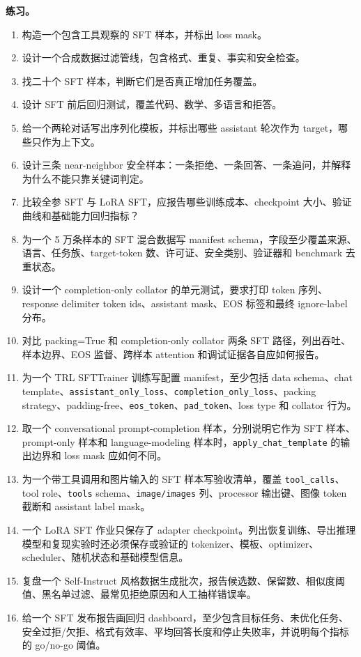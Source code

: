 \documentclass[UTF8,zihao=-4,openany]{ctexbook}
\begin{document}
\textbf{练习。}
\begin{enumerate}
\item 构造一个包含工具观察的 SFT 样本，并标出 loss mask。
\item 设计一个合成数据过滤管线，包含格式、重复、事实和安全检查。
\item 找二十个 SFT 样本，判断它们是否真正增加任务覆盖。
\item 设计 SFT 前后回归测试，覆盖代码、数学、多语言和拒答。
\item 给一个两轮对话写出序列化模板，并标出哪些 assistant 轮次作为 target，哪些只作为上下文。
\item 设计三条 near-neighbor 安全样本：一条拒绝、一条回答、一条追问，并解释为什么不能只靠关键词判定。
\item 比较全参 SFT 与 LoRA SFT，应报告哪些训练成本、checkpoint 大小、验证曲线和基础能力回归指标？
\item 为一个 5 万条样本的 SFT 混合数据写 manifest schema，字段至少覆盖来源、语言、任务族、target-token 数、许可证、安全类别、验证器和 benchmark 去重状态。
\item 设计一个 completion-only collator 的单元测试，要求打印 token 序列、response delimiter token ids、assistant mask、EOS 标签和最终 ignore-label 分布。
\item 对比 packing=True 和 completion-only collator 两条 SFT 路径，列出吞吐、样本边界、EOS 监督、跨样本 attention 和调试证据各自应如何报告。
\item 为一个 TRL SFTTrainer 训练写配置 manifest，至少包括 data schema、chat template、\texttt{assistant\_only\_loss}、\texttt{completion\_only\_loss}、packing strategy、padding-free、\texttt{eos\_token}、\texttt{pad\_token}、loss type 和 collator 行为。
\item 取一个 conversational prompt-completion 样本，分别说明它作为 SFT 样本、prompt-only 样本和 language-modeling 样本时，\texttt{apply\_chat\_template} 的输出边界和 loss mask 应如何不同。
\item 为一个带工具调用和图片输入的 SFT 样本写验收清单，覆盖 \texttt{tool\_calls}、tool role、\texttt{tools} schema、\texttt{image/images} 列、processor 输出键、图像 token 截断和 assistant label mask。
\item 一个 LoRA SFT 作业只保存了 adapter checkpoint。列出恢复训练、导出推理模型和复现实验时还必须保存或验证的 tokenizer、模板、optimizer、scheduler、随机状态和基础模型信息。
\item 复盘一个 Self-Instruct 风格数据生成批次，报告候选数、保留数、相似度阈值、黑名单过滤、最常见拒绝原因和人工抽样错误率。
\item 给一个 SFT 发布报告画回归 dashboard，至少包含目标任务、未优化任务、安全过拒/欠拒、格式有效率、平均回答长度和停止失败率，并说明每个指标的 go/no-go 阈值。
\end{enumerate}
\end{document}
